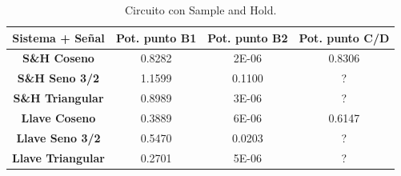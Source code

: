 \begin{table}[H]
\centering
\begin{tabular}{cccc}
\hline
\textbf{Sistema + Señal}  & \textbf{Pot. punto B1} & \textbf{Pot. punto B2} & \textbf{Pot. punto C/D} \\ \hline
\textbf{S\&H Coseno}     & 0.8282   & 2E-06 & 0.8306\\
\textbf{S\&H Seno 3/2}   & 1.1599  & 0.1100 & ?\\
\textbf{S\&H Triangular} & 0.8989  & 3E-06 &	?\\
\textbf{Llave Coseno}     & 0.3889 & 6E-06 & 0.6147 \\
\textbf{Llave Seno 3/2}   & 0.5470  & 0.0203 & ?\\
\textbf{Llave Triangular} & 0.2701	& 5E-06 & ?\\ \hline
\end{tabular}
\caption{Circuito con Sample and Hold.}
\label{tab:res3}
\end{table}

